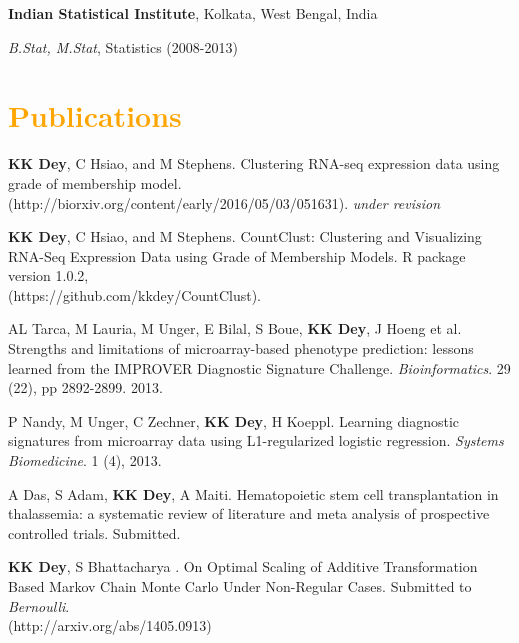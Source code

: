 \documentclass[margin,line]{res}
\newenvironment{list1}{
  \begin{list}{\ding{113}}{%
      \setlength{\itemsep}{0in}
      \setlength{\parsep}{0in} \setlength{\parskip}{0in}
      \setlength{\topsep}{0in} \setlength{\partopsep}{0in} 
      \setlength{\leftmargin}{0.17in}}}{\end{list}}
\begin{document}
\begin{resume}
\vspace{0.2in}

{\bf Indian Statistical Institute}, Kolkata, West Bengal, India\\
\vspace*{-.1in}
\begin{list1}
\item[] \emph{B.Stat, M.Stat}, Statistics (2008-2013)
\end{list1}


\section{\sc \textcolor{Orange}{Publications}}

\begin{enumerate}

\small{

\item \textbf{KK Dey}, C Hsiao, and M Stephens. Clustering RNA-seq expression data using grade of membership model. (http://biorxiv.org/content/early/2016/05/03/051631). \textit{under revision}

\item \textbf{KK Dey}, C Hsiao, and M Stephens. CountClust: Clustering and Visualizing RNA-Seq Expression Data using Grade of Membership Models. R package version 1.0.2, \\
(https://github.com/kkdey/CountClust).

\item AL Tarca, M Lauria, M Unger, E Bilal, S Boue, \textbf{KK Dey}, J Hoeng et al. Strengths and limitations of microarray-based phenotype prediction: lessons learned from the IMPROVER Diagnostic Signature Challenge. \textit{Bioinformatics}. 29 (22), pp 2892-2899. 2013.

\item P Nandy, M Unger, C Zechner, \textbf{KK Dey}, H Koeppl. Learning diagnostic signatures from microarray data using L1-regularized logistic regression. \textit{Systems Biomedicine}. 1 (4), 2013. 

\item A Das, S Adam, \textbf{KK Dey}, A Maiti. Hematopoietic stem cell transplantation in thalassemia: a systematic review of literature and meta analysis of prospective controlled trials. Submitted.

\item \textbf{KK Dey}, S Bhattacharya . On Optimal Scaling of Additive Transformation Based Markov Chain Monte Carlo Under Non-Regular Cases. Submitted to \textit{Bernoulli}. \\
(http://arxiv.org/abs/1405.0913)

}
\end{enumerate}
\end{resume}
\end{document}
